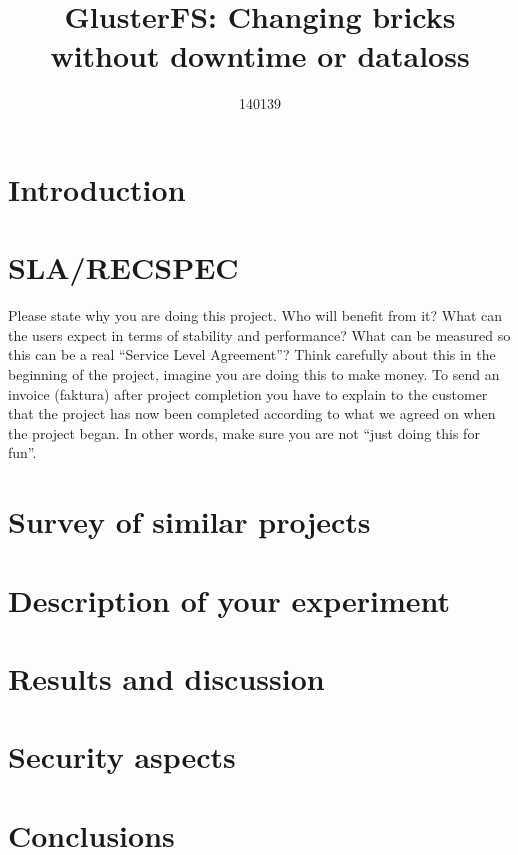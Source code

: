 

\title{GlusterFS: Changing bricks without downtime or dataloss}
\author{140139}



\maketitle


\thispagestyle{empty}

\clearpage
{}
\setcounter{page}{1}
\tableofcontents

\clearpage
{}

\section{Introduction}


\section{SLA/RECSPEC}

Please state why you are doing this project. Who will benefit from it? What
can the users expect in terms of stability and performance? What can be
measured so this can be a real ``Service Level Agreement''? Think carefully
about this in the beginning of the project, imagine you are doing this to
make money. To send an invoice (faktura) after project completion you have
to explain to the customer that the project has now been completed
according to what we agreed on when the project began. In other words, make
sure you are not ``just doing this for fun''.

\section{Survey of similar projects}


\section{Description of your experiment}


\section{Results and discussion}


\section{Security aspects}


\section{Conclusions}






